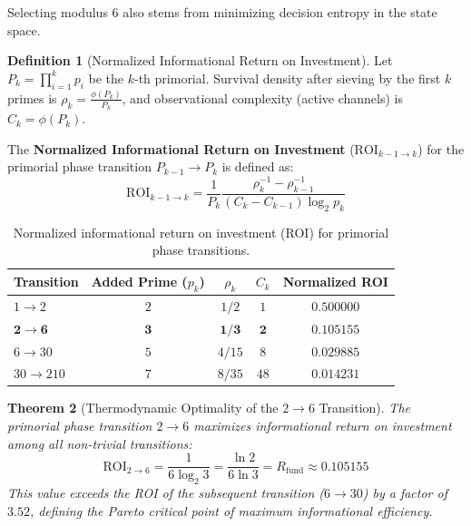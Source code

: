 \documentclass{article}
\numberwithin{equation}{section}
\theoremstyle{plain}
\newtheorem{theorem}{Theorem}[section]
\theoremstyle{definition}
\newtheorem{definition}[theorem]{Definition}
\begin{document}
Selecting modulus 6 also stems from minimizing decision entropy in the state space.

\begin{definition}[Normalized Informational Return on Investment]
\label{def:roi}
Let $P_k = \prod_{i=1}^{k} p_i$ be the $k$-th primorial. Survival density after sieving by the first $k$ primes is $\rho_k = \frac{\phi(P_k)}{P_k}$, and observational complexity (active channels) is $C_k = \phi(P_k)$.

The \textbf{Normalized Informational Return on Investment} ($\mathrm{ROI}_{k-1 \to k}$) for the primorial phase transition $P_{k-1} \to P_k$ is defined as:
\begin{equation}
\mathrm{ROI}_{k-1 \to k} = \frac{1}{P_k} \frac{\rho_k^{-1} - \rho_{k-1}^{-1}}{(C_k - C_{k-1}) \log_2 p_k}
\end{equation}
\end{definition}

\begin{table}[htbp]
\centering
\caption{Normalized informational return on investment (ROI) for primorial phase transitions.}
\label{tab:roi}
\begin{tabular}{lcccc}
\toprule
\textbf{Transition} & \textbf{Added Prime ($p_k$)} & $\rho_k$ & $C_k$ & \textbf{Normalized ROI} \\
\midrule
$1 \to 2$   & $2$ & $1/2$  & $1$  & $0.500000$ \\
$\mathbf{2 \to 6}$   & $\mathbf{3}$ & $\mathbf{1/3}$  & $\mathbf{2}$  & $\mathbf{0.105155}$ \\
$6 \to 30$  & $5$ & $4/15$ & $8$  & $0.029885$ \\
$30 \to 210$ & $7$ & $8/35$ & $48$ & $0.014231$ \\
\bottomrule
\end{tabular}
\end{table}

\begin{theorem}[Thermodynamic Optimality of the $2 \to 6$ Transition]
\label{thm:optimalidad-termodinamica}
The primorial phase transition $2 \to 6$ maximizes informational return on investment among all non-trivial transitions:
\begin{equation}
\mathrm{ROI}_{2 \to 6} = \frac{1}{6 \log_2 3} = \frac{\ln 2}{6 \ln 3} = R_{\text{fund}} \approx 0.105155
\end{equation}
This value exceeds the ROI of the subsequent transition ($6 \to 30$) by a factor of $3.52$, defining the Pareto critical point of maximum informational efficiency.
\end{theorem}
\end{document}
